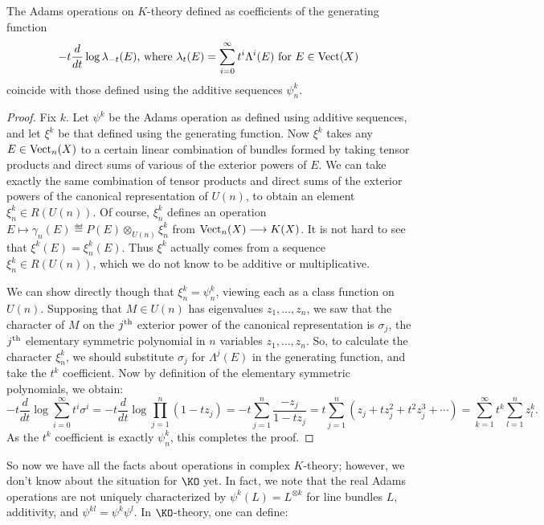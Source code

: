 \begin{claim}
The Adams operations on $K$-theory defined as coefficients of the generating function
\[-t \frac{d}{dt}\log \lambda_{-t}(E)\textup{, where }\lambda_t(E)=\sum_{i=0}^\infty t^i\Lambda^i(E)\text{ for } E\in\operatorname{Vect}(X)\]
coincide with those defined using the additive sequences $\psi^k_n$.
\end{claim}
\begin{proof}
Fix $k$. Let $\psi^k$ be the Adams operation as defined using additive sequences, and let $\xi^k$ be that defined using the generating function. Now $\xi^k$ takes any $E\in\operatorname{Vect}_n(X)$ to a certain linear combination of bundles formed by taking tensor products and direct sums of various of the exterior powers of $E$. We can take exactly the same combination of tensor products and direct sums of the exterior powers of the canonical representation of $U(n)$, to obtain an element $\xi^k_n\in R(U(n))$. Of course, $\xi^k_n$ defines an operation $E\mapsto \gamma_n(E) \eqdef P(E)\otimes_{U(n)}\xi^k_n$ from $\operatorname{Vect}_n(X)\longrightarrow K(X)$. It is not hard to see that $\xi^k(E)=\xi^k_n(E)$. Thus $\xi^k$ actually comes from a sequence $\xi^k_n\in R(U(n))$, which we do not know to be additive or multiplicative.

We can show directly though that $\xi^k_n=\psi^k_n$, viewing each as a class function on $U(n)$. Supposing that $M\in U(n)$ has eigenvalues $z_1,\ldots,z_n$, we saw that the character of $M$ on the $j^\textup{th}$ exterior power of the canonical representation is $\sigma_j$, the $j^\textup{th}$ elementary symmetric polynomial in $n$ variables $z_1,\ldots,z_n$. So, to calculate the character $\xi^k_n$, we should substitute $\sigma_j$ for $\Lambda^j(E)$ in the generating function, and take the $t^k$ coefficient.
Now by definition of the elementary symmetric polynomials, we obtain:
\[-t\frac{d}{dt}\log\sum_{i=0}^\infty t^i\sigma^i
=-t\frac{d}{dt}\log\prod_{j=1}^n(1-t z_j)=-t\sum_{j=1}^n\frac{-z_j}{1-tz_j}=t\sum_{j=1}^n \left(z_j+tz_j^2+t^2z_j^3+\cdots\right)=\sum_{k=1}^\infty t^k \sum_{l=1}^nz_l^k.\]
As the $t^k$ coefficient is exactly $\psi^k_n$, this completes the proof.
\end{proof}
So now we have all the facts about operations in complex $K$-theory; however, we don't know about the situation for $\KO$ yet.  In fact, we note that the real Adams operations are not uniquely characterized by $\psi^k(L) = L^{\otimes k}$ for line bundles $L$, additivity, and $\psi^{kl} = \psi^k \psi^l$.  In $\KO$-theory, one can define:
